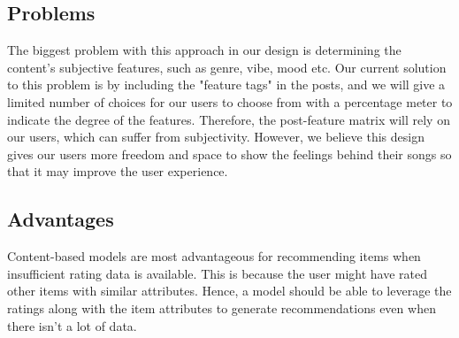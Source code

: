\subsection*{Problems}
The biggest problem with this approach in our design is determining the content's subjective features, such as genre, vibe, mood etc. Our current solution to this problem is by including the "feature tags" in the posts, and we will give a limited number of choices for our users to choose from 
with a percentage meter to indicate the degree of the features. Therefore, the post-feature matrix will rely on our users, which can suffer from subjectivity.
However, we believe this design gives our users more freedom and space to show the feelings behind their songs so that it may improve the user experience.
%
\subsection*{Advantages}
Content-based models are most advantageous for recommending items when insufficient rating data is available. This is because the user might have rated other items with similar attributes. Hence, a model should be able to leverage the ratings along with the item attributes to generate recommendations even when there isn’t a lot of data.


